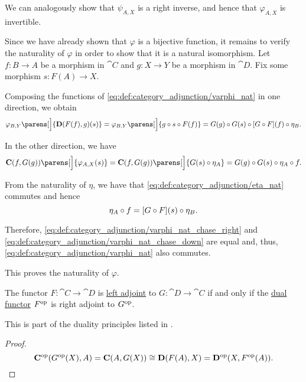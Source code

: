 \begin{defproof}
  We can analogously show that \( \psi_{A,X} \) is a right inverse, and hence that \( \varphi_{A,X} \) is invertible.

  Since we have already shown that \( \varphi \) is a bijective function, it remains to verify the naturality of \( \varphi \) in order to show that it is a natural isomorphism. Let \( f: B \to A \) be a morphism in \( \cat{C} \) and \( g: X \to Y \) be a morphism in \( \cat{D} \). Fix some morphism \( s: F(A) \to X \).

  Composing the functions of \eqref{eq:def:category_adjunction/varphi_nat} in one direction, we obtain
  \begin{equation}\label{eq:def:category_adjunction/varphi_nat_chase_right}
    \varphi_{B, Y}\parens[\Big]{ \cat{D}(F(f), g)(s) }
    =
    \varphi_{B, Y}\parens[\Big]{ g \bincirc s \bincirc F(f) }
    =
    G(g) \bincirc G(s) \bincirc [G \bincirc F](f) \bincirc \eta_B.
  \end{equation}

  In the other direction, we have
  \begin{equation}\label{eq:def:category_adjunction/varphi_nat_chase_down}
    \cat{C}(f, G(g))\parens[\Big]{ \varphi_{A, X}(s) }
    =
    \cat{C}(f, G(g))\parens[\Big]{ G(s) \bincirc \eta_A }
    =
    G(g) \bincirc G(s) \bincirc \eta_A \bincirc f.
  \end{equation}

  From the naturality of \( \eta \), we have that \eqref{eq:def:category_adjunction/eta_nat} commutes and hence
  \begin{equation*}
    \eta_A \bincirc f
    =
    [G \bincirc F](s) \bincirc \eta_B.
  \end{equation*}

  Therefore, \eqref{eq:def:category_adjunction/varphi_nat_chase_right} and \eqref{eq:def:category_adjunction/varphi_nat_chase_down} are equal and, thus, \eqref{eq:def:category_adjunction/varphi_nat} also commutes.

  This proves the naturality of \( \varphi \).
\end{defproof}

\begin{proposition}\label{thm:category_adjunction_duality}
  The functor \( F: \cat{C} \to \cat{D} \) is \hyperref[def:category_adjunction]{left adjoint} to \( G: \cat{D} \to \cat{C} \) if and only if the \hyperref[def:dual_functor]{dual functor} \( F^{\operatorname{op}} \) is right adjoint to \( G^{\operatorname{op}} \).

  This is part of the duality principles listed in .
\end{proposition}
\begin{proof}
  \begin{equation*}
    \operatorname{\mathbf{C^{\operatorname{op}}}}(G^{\operatorname{op}}(X), A) = \operatorname{\mathbf{C}}(A, G(X)) \cong \operatorname{\mathbf{D}}(F(A), X) = \operatorname{\mathbf{D^{\operatorname{op}}}}(X, F^{\operatorname{op}}(A)).
  \end{equation*}
\end{proof}

